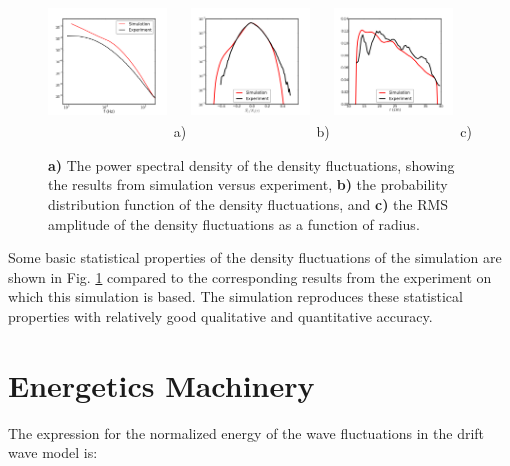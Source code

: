 \documentclass[12pt]{article}
\begin{document}
\begin{figure}
\includegraphics[width=0.28\textwidth,height=40mm]{sim_vs_exp_spec}~a)
\hfil
\includegraphics[width=0.28\textwidth,height=40mm]{pdf}~b)
\hfil
\includegraphics[width=0.28\textwidth,height=40mm]{radial_rms}~c)
\hfil
\caption{\textbf{a)} The power spectral density of the density fluctuations, showing the results from simulation versus experiment, \textbf{b)} the probability distribution function
of the density fluctuations, and \textbf{c)} the RMS amplitude of the density fluctuations as a function of radius.}
\label{validation}
\end{figure}

Some basic statistical properties of the density fluctuations of the simulation are shown in Fig. \ref{validation} compared to the corresponding results from the experiment on which
this simulation is based. The simulation reproduces these statistical properties with relatively good qualitative and quantitative accuracy.

\section{Energetics Machinery}
\label{sec_energetics_machinery}


The expression for the normalized energy of the wave fluctuations in the drift wave model is:
\end{document}
